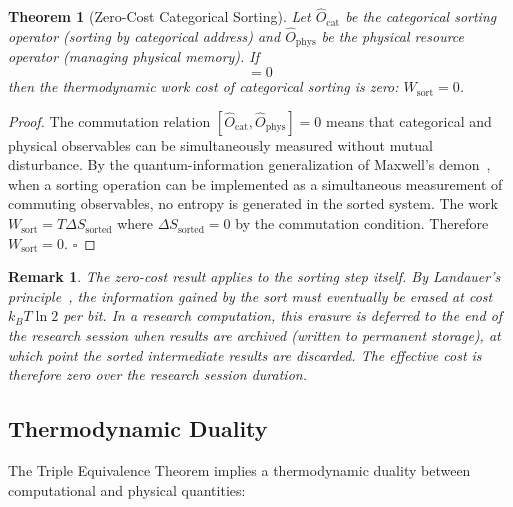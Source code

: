 \documentclass[12pt,twocolumn]{article}
\newtheorem{theorem}{Theorem}[section]
\newtheorem{remark}{Remark}[section]
\begin{document}
\begin{theorem}[Zero-Cost Categorical Sorting]
\label{thm:zero_cost}
Let $\hat{O}_{\text{cat}}$ be the categorical sorting operator (sorting by categorical address) and $\hat{O}_{\text{phys}}$ be the physical resource operator (managing physical memory). If
\begin{equation}
[\hat{O}_{\text{cat}}, \hat{O}_{\text{phys}}] = 0
\end{equation}
then the thermodynamic work cost of categorical sorting is zero: $W_{\text{sort}} = 0$.
\end{theorem}

\begin{proof}
The commutation relation $[\hat{O}_{\text{cat}}, \hat{O}_{\text{phys}}] = 0$ means that categorical and physical observables can be simultaneously measured without mutual disturbance. By the quantum-information generalization of Maxwell's demon~\cite{zurek1989thermodynamic}, when a sorting operation can be implemented as a simultaneous measurement of commuting observables, no entropy is generated in the sorted system. The work $W_{\text{sort}} = T \Delta S_{\text{sorted}}$ where $\Delta S_{\text{sorted}} = 0$ by the commutation condition. Therefore $W_{\text{sort}} = 0$. $\square$
\end{proof}

\begin{remark}
The zero-cost result applies to the sorting step itself. By Landauer's principle~\cite{landauer1961irreversibility}, the information gained by the sort must eventually be erased at cost $k_B T \ln 2$ per bit. In a research computation, this erasure is deferred to the end of the research session when results are archived (written to permanent storage), at which point the sorted intermediate results are discarded. The effective cost is therefore zero over the research session duration.
\end{remark}

\subsection{Thermodynamic Duality}

The Triple Equivalence Theorem implies a thermodynamic duality between computational and physical quantities:
\end{document}
